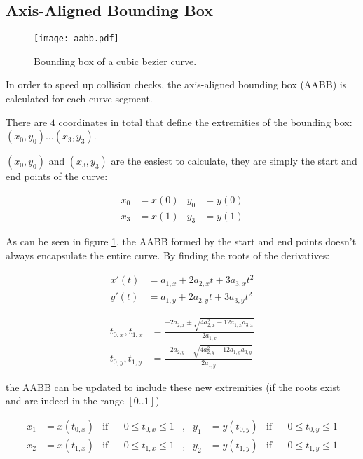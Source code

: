 \clearpage
\subsection{Axis-Aligned Bounding Box}

\begin{figure}
    \centering
    \texttt{[image: aabb.pdf]}
    \caption{Bounding box of a cubic bezier curve.}
    \label{fig:bezier_aabb}
\end{figure}

In order to speed up collision checks,  the axis-aligned bounding box (AABB) is
calculated for each curve segment.

There are $4$ coordinates in total that define  the extremities of the bounding
box: $(x_0,y_0) \ldots (x_3,y_3)$.

$(x_0,y_0)$  and $(x_3,y_3)$ are the easiest to calculate, they are simply  the
start and end points of the curve:

\begin{align}
    x_0 &= x(0) & y_0 &= y(0) \\
    x_3 &= x(1) & y_3 &= y(1)
\end{align}

As  can  be  seen in figure \ref{fig:bezier_aabb}, the AABB formed by the start
and  end  points  doesn't  always encapsulate the entire curve. By finding  the
roots of the derivatives:

\begin{align}
    x'(t) &= a_{1,x} + 2 a_{2,x} t + 3 a_{3,x} t^2 \\
    y'(t) &= a_{1,y} + 2 a_{2,y} t + 3 a_{3,y} t^2
\end{align}

\begin{align}
    {t_{0,x},t_{1,x}} &= \frac{-2 a_{2,x} \pm\sqrt{4a_{2,x}^2 - 12 a_{1,x} a_{3,x}}}{2 a_{1,x}} \\
    {t_{0,y},t_{1,y}} &= \frac{-2 a_{2,y} \pm\sqrt{4a_{2,y}^2 - 12 a_{1,y} a_{3,y}}}{2 a_{1,y}}
\end{align}

the AABB  can  be  updated to include these new extremities (if the roots exist
and are indeed in the range $[0..1]$)

\begin{align}
    x_1 &= x(t_{0,x}) & \text{if} && 0 \le t_{0,x} \le 1 &,& y_1 &= y(t_{0,y}) & \text{if} && 0 \le t_{0,y} \le 1 \\
    x_2 &= x(t_{1,x}) & \text{if} && 0 \le t_{1,x} \le 1 &,& y_2 &= y(t_{1,y}) & \text{if} && 0 \le t_{1,y} \le 1
\end{align}

